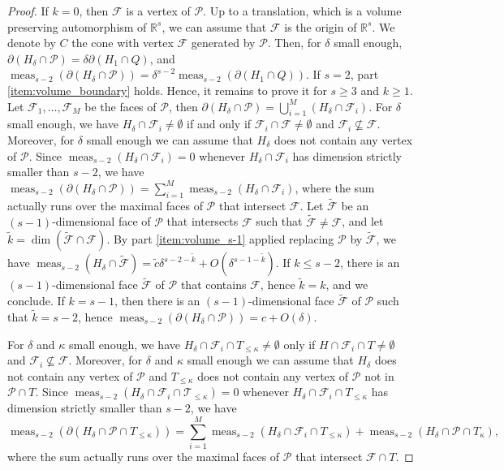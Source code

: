 \documentclass[11pt]{article}
\numberwithin{equation}{section}
\let\del\delta
\newcommand{\calP}{\mathcal{P}}
\newcommand\RR{\mathbb{R}}
\DeclareMathOperator{\meas}{meas}
\theoremstyle{definition}
\numberwithin{theorem}{section}
\begin{document}
\begin{proof}
If $k=0$, then $\mathcal F$ is a vertex of $\mathcal P$.
Up to a translation, which is a volume preserving automorphism of $\RR^s$,
we can assume that $\mathcal F$ is the origin of $\RR^s$.
We denote by $C$ the cone with vertex $\mathcal F$ generated by $\mathcal P$.
Then, for $\delta$ small enough,
$\partial(H_\delta\cap\mathcal P)=\delta\partial(H_1\cap Q)$,
and $\meas_{s-2}(\partial(H_\delta\cap\mathcal P))=\delta^{s-2}\meas_{s-2} (\partial(H_1\cap Q))$.
If $s=2$, part \eqref{item:volume_boundary} holds. Hence, it remains to prove it
for $s\geq3$ and $k\geq1$.
Let $\mathcal F_1,\dots,\mathcal F_M$ be the faces of $\mathcal P$,
then $\partial (H_\delta\cap\mathcal P)=\bigcup_{i=1}^M(H_\delta\cap\mathcal F_i)$.
For $\delta$ small enough, we have $H_\delta\cap\mathcal F_i\neq\emptyset$
if and only if $\mathcal F_i\cap\mathcal F\neq\emptyset$ and $\mathcal F_i\nsubseteq\mathcal F$.
Moreover, for $\delta$ small enough we can assume that $H_\delta$
does not contain any vertex of $\mathcal P$.
Since $\meas_{s-2}(H_\delta\cap\mathcal F_i)=0$ whenever $H_\delta\cap\mathcal F_i$
has dimension strictly smaller than $s-2$, we have
$\meas_{s-2}(\partial(H_\delta\cap\mathcal P))=\sum_{i=1}^M\meas_{s-2}(H_\delta\cap\mathcal F_i)$,
where the sum actually runs over the maximal faces of $\mathcal P$ that intersect $\mathcal F$.
Let $\widetilde {\mathcal F}$ be an $(s-1)$-dimensional face of $\mathcal P$ that intersects
$\mathcal F$ such that $\widetilde {\mathcal F}\neq\mathcal F$,
and let $\tilde k=\dim(\widetilde{\mathcal F}\cap\mathcal F)$.
By part \eqref{item:volume_s-1} applied replacing $\mathcal P$ by $\widetilde{\mathcal F}$, we have
$\meas_{s-2}(H_\delta\cap\widetilde{\mathcal F})
=\widetilde c \delta^{s-2-\tilde k}+O(\delta^{s-1-\widetilde k})$.
If $k\leq s-2$, there is an $(s-1)$-dimensional face $\widetilde {\mathcal F}$ of $\mathcal P$
that contains $\mathcal F$, hence $\tilde k=k$, and we conclude.
If $k=s-1$, then there is an $(s-1)$-dimensional face $\widetilde {\mathcal F}$
of $\mathcal P$ such that $\tilde k=s-2$, hence
$\meas_{s-2} (\partial(H_\delta \cap \mathcal P))= c +O(\delta)$.

For $\delta$ and $\kappa$ small enough, we have $H_{\del}\cap \mathcal F_i\cap T_{\leq\kappa}\neq\emptyset$
only if $H\cap \mathcal F_i\cap T\neq\emptyset$ and $\mathcal F_i\nsubseteq \mathcal F$.
Moreover, for $\delta$ and $\kappa$ small enough we can assume that $H_{\del}$ does not contain any
vertex of $\mathcal P$ and $T_{\leq\kappa}$ does not contain any vertex of $\mathcal P$ not in $\mathcal P\cap T$.
Since $\meas_{s-2}(H_\delta\cap\mathcal F_i \cap \mathcal T_{\leq\kappa})=0$ whenever
$H_\delta\cap\mathcal F_i\cap T_{\leq\kappa}$ has dimension strictly smaller than $s-2$, we have
\[
\meas_{s-2}(\partial (H_{\del}\cap \calP\cap T_{\leq\kappa}))
=\sum_{i=1}^M\meas_{s-2}(H_\delta\cap\mathcal F_i\cap T_{\leq\kappa})
+\meas_{s-2}(H_{\del}\cap \calP\cap T_\kappa),
\]
where the sum actually runs over the maximal faces of $\mathcal P$ that intersect $\mathcal F\cap T$.


\end{proof}
\end{document}
